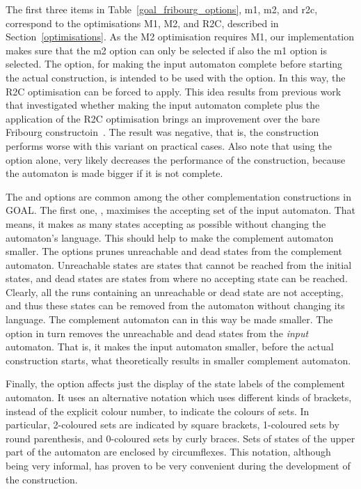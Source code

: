 The first three items in Table~\ref{goal_fribourg_options}, m1, m2, and r2c, correspond to the optimisations M1, M2, and R2C, described in Section~\ref{optimisations}. As the M2 optimisation requires M1, our implementation makes sure that the m2 option can only be selected if also the m1 option is selected. The  option, for making the input automaton complete before starting the actual construction, is intended to be used with the  option. In this way, the R2C optimisation can be forced to apply. This idea results from previous work that investigated whether making the input automaton complete plus the application of the R2C optimisation brings an improvement over the bare Fribourg constructoin~\cite{2013_bsc_goettel}. The result was negative, that is, the construction performs worse with this variant on practical cases. Also note that using the  option alone, very likely decreases the performance of the construction, because the automaton is made bigger if it is not complete.

The  and  options are common among the other complementation constructions in GOAL. The first one, , maximises the accepting set of the input automaton. That means, it makes as many states accepting as possible without changing the automaton's language. This should help to make the complement automaton smaller. The  options prunes unreachable and dead states from the complement automaton. Unreachable states are states that cannot be reached from the initial states, and dead states are states from where no accepting state can be reached. Clearly, all the runs containing an unreachable or dead state are not accepting, and thus these states can be removed from the automaton without changing its language. The complement automaton can in this way be made smaller. The  option in turn removes the unreachable and dead states from the \emph{input} automaton. That is, it makes the input automaton smaller, before the actual construction starts, what theoretically results in smaller complement automaton.

Finally, the  option affects just the display of the state labels of the complement automaton. It uses an alternative notation which uses different kinds of brackets, instead of the explicit colour number, to indicate the colours of sets. In particular, 2-coloured sets are indicated by square brackets, 1-coloured sets by round parenthesis, and 0-coloured sets by curly braces. Sets of states of the upper part of the automaton are enclosed by circumflexes. This notation, although being very informal, has proven to be very convenient during the development of the construction.


